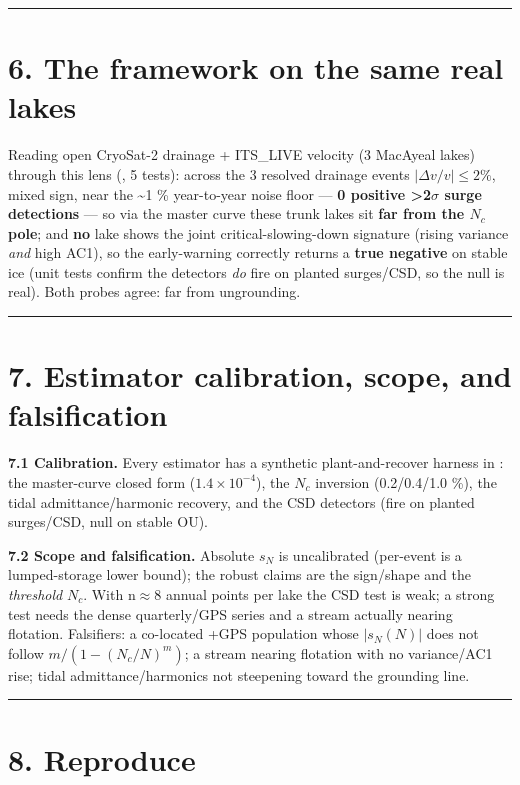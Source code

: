 \documentclass[11pt]{article}
\begin{document}
\medskip\hrule\medskip


\section*{6. The framework on the same real lakes}


Reading open CryoSat-2 drainage + ITS\_LIVE velocity (3 MacAyeal lakes) through this lens (, 5 tests): across the 3 resolved drainage events $|\Delta v/v|\le 2 \%$, mixed sign, near the \textasciitilde{}1 \% year-to-year noise floor — \textbf{0 positive >2\ensuremath{\sigma} surge detections} — so via the master curve these trunk lakes sit \textbf{far from the $N_{c}$ pole}; and \textbf{no} lake shows the joint critical-slowing-down signature (rising variance \emph{and} high AC1), so the early-warning correctly returns a \textbf{true negative} on stable ice (unit tests confirm the detectors \emph{do} fire on planted surges/CSD, so the null is real). Both probes agree: far from ungrounding.


\medskip\hrule\medskip


\section*{7. Estimator calibration, scope, and falsification}


\textbf{7.1 Calibration.} Every estimator has a synthetic plant-and-recover harness in : the master-curve closed form ($1.4\times 10^{-4}$), the $N_{c}$ inversion (0.2/0.4/1.0 \%), the tidal admittance/harmonic recovery, and the CSD detectors (fire on planted surges/CSD, null on stable OU).


\textbf{7.2 Scope and falsification.} Absolute $s_{N}$ is uncalibrated (per-event  is a lumped-storage lower bound); the robust claims are the sign/shape and the \emph{threshold} $N_{c}$. With n\ensuremath{\approx}8 annual points per lake the CSD test is weak; a strong test needs the dense quarterly/GPS series and a stream actually nearing flotation. Falsifiers: a co-located +GPS population whose $|s_{N}(N)|$ does not follow $m/(1-(N_{c}/N)^{m})$; a stream nearing flotation with no variance/AC1 rise; tidal admittance/harmonics not steepening toward the grounding line.


\medskip\hrule\medskip


\section*{8. Reproduce}
\end{document}
